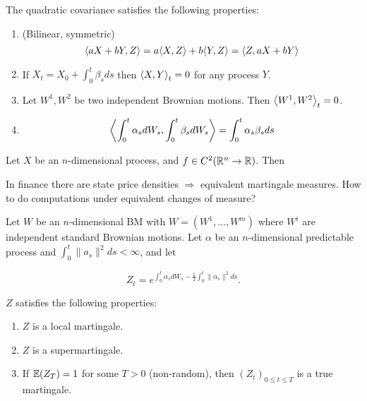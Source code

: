 \begin{proposition}
  The quadratic covariance satisfies the following properties:
  \begin{enumerate}
  \item (Bilinear, symmetric)
    \begin{equation}
      \label{eq:45}
      \IP{ aX + bY, Z } = a \IP{ X, Z } + b \IP {Y, Z} = \IP{ Z, aX + bY }
    \end{equation}
  \item If $X_{t} = X_{0} + \int_{0}^{t} \beta_{s} ds$ then $\IP{X,
      Y}_{t} = 0$ for any \ito process $Y$.
  \item Let $W^{1}, W^{2}$ be two independent Brownian motions.  Then
    $\IP{ W^{1}, W^{2} }_{t} = 0$.
  \item
    \begin{equation}
      \label{eq:46}
      \IP{\int_{0}^{t} \alpha_{s} dW_{s}, \int_{0}^{t} \beta_{s}
        dW_{s}} = 
      \int_{0}^{t} \alpha_{s} \beta_{s} ds
    \end{equation}
  \end{enumerate}
\end{proposition}

Let $X$ be an $n$-dimensional \ito process, and $f \in C^{2}(\mathbb{R}^{n}
\rightarrow \mathbb{R})$.  Then
\begin{equation}
  \label{eq:47}
\end{equation}


In finance there are state price densities $\Rightarrow$ equivalent
martingale measures.  How to do computations under equivalent changes
of measure?

Let $W$ be an $n$-dimensional BM with $W = (W^{1}, \dots, W^{m})$
where $W^{i}$ are independent standard Brownian motions.  Let $\alpha$
be an $n$-dimensional predictable process and $\int_{0}^{t} \| a_{s}
\|^{2} ds < \infty$, and let

\begin{equation}
  \label{eq:48}
  Z_{t} = e^{\int_{0}^{t} \alpha_{s}
    dW_{s} - \frac{1}{2} \int_{0}^{t} \| \alpha_{s} \|^{2} ds}.
\end{equation}

\begin{proposition}
  $Z$ satisfies the following properties:
  \begin{enumerate}
  \item $Z$ is a local martingale.
  \item $Z$ is a supermartingale.
  \item If $\E{Z_{T}} = 1$ for some $T > 0$ (non-random), then
    $(Z_{t})_{0 \leq t \leq T}$ is a true martingale.
  \end{enumerate}
\end{proposition}

